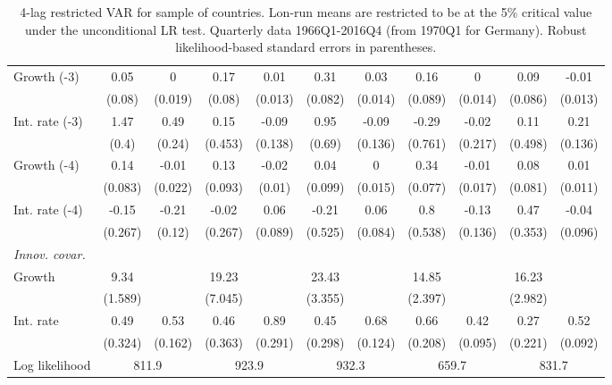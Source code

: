 \begin{table}[htbp]
\begin{tabular}{@{\extracolsep{4pt}}lcccccccccc@{}}
\quad Growth (-3) 	 &0.05 	 & 0 	 & 0.17 	 & 0.01 	 & 0.31 	 & 0.03 	 & 0.16 	 & 0 	 & 0.09 	 & -0.01	 \\ 
 		 & (0.08) 	 & (0.019) 	 & (0.08) 	 & (0.013) 	 & (0.082) 	 & (0.014) 	 & (0.089) 	 & (0.014) 	 & (0.086) 	 & (0.013) 	 \\ 
\quad Int. rate (-3) 	 &1.47 	 & 0.49 	 & 0.15 	 & -0.09 	 & 0.95 	 & -0.09 	 & -0.29 	 & -0.02 	 & 0.11 	 & 0.21	 \\ 
 		 & (0.4) 	 & (0.24) 	 & (0.453) 	 & (0.138) 	 & (0.69) 	 & (0.136) 	 & (0.761) 	 & (0.217) 	 & (0.498) 	 & (0.136) 	 \\ 
\quad Growth (-4) 	 &0.14 	 & -0.01 	 & 0.13 	 & -0.02 	 & 0.04 	 & 0 	 & 0.34 	 & -0.01 	 & 0.08 	 & 0.01	 \\ 
 		 & (0.083) 	 & (0.022) 	 & (0.093) 	 & (0.01) 	 & (0.099) 	 & (0.015) 	 & (0.077) 	 & (0.017) 	 & (0.081) 	 & (0.011) 	 \\ 
\quad Int. rate (-4) 	 &-0.15 	 & -0.21 	 & -0.02 	 & 0.06 	 & -0.21 	 & 0.06 	 & 0.8 	 & -0.13 	 & 0.47 	 & -0.04	 \\ 
 		 & (0.267) 	 & (0.12) 	 & (0.267) 	 & (0.089) 	 & (0.525) 	 & (0.084) 	 & (0.538) 	 & (0.136) 	 & (0.353) 	 & (0.096) 	 \\ 
\rule{0pt}{4ex} \emph{Innov. covar.}  	 & 	 & 	 & 	 & 	 & 	 & 	 & 	 & 	 & 	 &\\ 
\quad Growth 	 &9.34 	 &  	 & 19.23 	 &  	 & 23.43 	 &  	 & 14.85 	 &  	 & 16.23 	 & 	 \\ 
 		 & (1.589) 	 &  	 & (7.045) 	 &  	 & (3.355) 	 &  	 & (2.397) 	 &  	 & (2.982) 	 &  	 \\ 
\quad Int. rate 	 &0.49 	 & 0.53 	 & 0.46 	 & 0.89 	 & 0.45 	 & 0.68 	 & 0.66 	 & 0.42 	 & 0.27 	 & 0.52	 \\ 
 		 & (0.324) 	 & (0.162) 	 & (0.363) 	 & (0.291) 	 & (0.298) 	 & (0.124) 	 & (0.208) 	 & (0.095) 	 & (0.221) 	 & (0.092) 	 \\ 
 \hline \rule{0pt}{4ex} 
  Log likelihood 	 &\multicolumn{2}{c}{811.9} 	 & \multicolumn{2}{c}{923.9} 	 & \multicolumn{2}{c}{932.3} 	 & \multicolumn{2}{c}{659.7} 	 & \multicolumn{2}{c}{831.7}\\ 

 \hline 	\end{tabular}		\caption{4-lag restricted VAR for sample of countries. Lon-run means are
                      restricted to be at the 5\% critical value under the unconditional
                      LR test. Quarterly data 1966Q1-2016Q4 (from 1970Q1 for Germany).
                      Robust likelihood-based standard errors in parentheses.}
		\label{tab:all_rest_1lag}

\end{table}